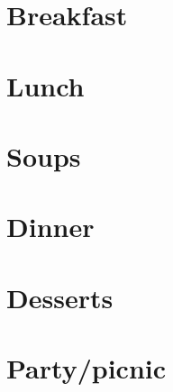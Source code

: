 \documentclass[%
titlepage,
b5paper,
twoside,
11pt
]{book}
\begin{document}
\chapter{Breakfast}

\newpage

\newpage

\newpage

\newpage

\newpage

\newpage

\chapter{Lunch}


\newpage

\newpage

\newpage

\newpage

\newpage

\newpage

\newpage

\chapter{Soups}


\newpage

\newpage

\newpage

\newpage

\newpage


\chapter{Dinner}


\newpage

\newpage

\newpage

\newpage

\newpage

\newpage

\newpage

\newpage
\newpage

\newpage

\newpage

\newpage

\newpage

\newpage

\newpage

\chapter{Desserts}

\newpage

\newpage

\newpage

\newpage

\newpage

\newpage

\newpage

\newpage


\chapter{Party/picnic}


\newpage

\newpage

\newpage

\newpage

\newpage
\end{document}
